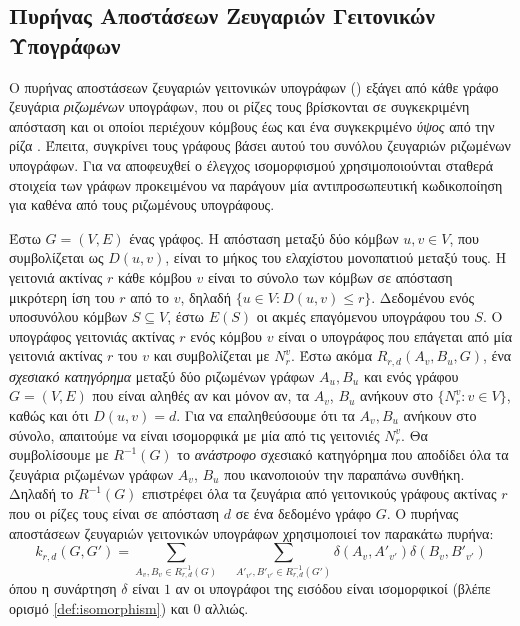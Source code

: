 \subsection{Πυρήνας Αποστάσεων Ζευγαριών Γειτονικών Υπογράφων}
\label{ssec:nspdk}
Ο πυρήνας αποστάσεων ζευγαριών γειτονικών υπογράφων () εξάγει από κάθε γράφο ζευγάρια \textit{ριζωμένων} υπογράφων, που οι ρίζες τους βρίσκονται σε συγκεκριμένη απόσταση και οι οποίοι περιέχουν κόμβους έως και ένα συγκεκριμένο \textit{ύψος} από την ρίζα \cite{costa2010fast}.
Έπειτα, συγκρίνει τους γράφους βάσει αυτού του συνόλου ζευγαριών ριζωμένων υπογράφων.
Για να αποφευχθεί ο έλεγχος ισομορφισμού χρησιμοποιούνται σταθερά στοιχεία των γράφων προκειμένου να παράγουν μία αντιπροσωπευτική κωδικοποίηση για καθένα από τους ριζωμένους υπογράφους.\par
Έστω $G=(V,E)$ ένας γράφος.
Η απόσταση μεταξύ δύο κόμβων $u,v \in V$, που συμβολίζεται ως $D(u,v)$, είναι το μήκος του ελαχίστου μονοπατιού μεταξύ τους.
Η γειτονιά ακτίνας $r$ κάθε κόμβου $v$ είναι το σύνολο των κόμβων σε απόσταση μικρότερη ίση του $r$ από το $v$, δηλαδή $\{ u \in V : D(u,v) \leq r\}$.
Δεδομένου ενός υποσυνόλου κόμβων $S \subseteq V$, έστω $E(S)$ οι ακμές επαγόμενου υπογράφου του $S$.
Ο υπογράφος γειτονιάς ακτίνας $r$ ενός κόμβου $v$ είναι ο υπογράφος που επάγεται από μία γειτονιά ακτίνας $r$ του $v$ και συμβολίζεται με $N_r^v$.
Έστω ακόμα $R_{r,d}(A_v,B_u,G)$, ένα \textit{σχεσιακό κατηγόρημα} μεταξύ δύο ριζωμένων γράφων $A_{u}, B_{u}$ και ενός γράφου $G=(V,E)$ που είναι αληθές αν και μόνον αν, τα $A_v$, $B_u$ ανήκουν στο $\{N_r^v : v \in V \}$, καθώς και ότι $D(u,v) = d$.
Για να επαληθεύσουμε ότι τα $A_v, B_u$ ανήκουν στο σύνολο, απαιτούμε να είναι ισομορφικά με μία από τις γειτονιές $N_r^v$.
Θα συμβολίσουμε με $R^{-1}(G)$ το \textit{ανάστροφο} σχεσιακό κατηγόρημα που αποδίδει όλα τα ζευγάρια ριζωμένων γράφων $A_v$, $B_u$ που ικανοποιούν την παραπάνω συνθήκη.
Δηλαδή το $R^{-1}(G)$ επιστρέφει όλα τα ζευγάρια από γειτονικούς γράφους ακτίνας $r$ που οι ρίζες τους είναι σε απόσταση $d$ σε ένα δεδομένο γράφο $G$.
Ο πυρήνας αποστάσεων ζευγαριών γειτονικών υπογράφων χρησιμοποιεί τον παρακάτω πυρήνα:
\begin{equation}
    k_{r,d}(G, G') = \sum_{A_v, B_v \in R_{r,d}^{-1}(G)} \quad \sum_{A'_{v'}, B'_{v'} \in R_{r,d}^{-1}(G')} \delta(A_v, A'_{v'}) \delta(B_v, B'_{v'})
\end{equation}
όπου η συνάρτηση $\delta$ είναι $1$ αν οι υπογράφοι της εισόδου είναι ισομορφικοί (βλέπε ορισμό \ref{def:isomorphism}) και $0$ αλλιώς.
